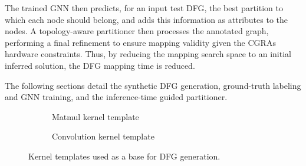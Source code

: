\documentclass[runningheads]{llncs}
\begin{document}
The trained GNN then predicts, for an input test DFG, the best partition to which each node should belong, and adds this information as attributes to the nodes. 
%
A topology-aware partitioner then processes the annotated graph, performing a final refinement to ensure mapping validity given the CGRAs hardware constraints. Thus, by reducing the mapping search space to an initial inferred solution, the DFG mapping time is reduced.


The following sections detail the synthetic DFG generation, ground-truth labeling and GNN training, and the inference-time guided partitioner.


% 

% 
\begin{figure}
    \centering
    \begin{subfigure}[b]{0.46\textwidth}
        \centering
        
        \caption{Matmul kernel template}
        \label{fig:matmul_dfg}
    \end{subfigure}
    \hfill %
    \begin{subfigure}[b]{0.49\textwidth}
        \centering
        
        \caption{Convolution kernel template}
        \label{fig:conv_dfg}
    \end{subfigure}
    
    \caption{Kernel templates used as a base for DFG generation.}
    \label{fig:kernel_templates}
\end{figure}
\end{document}

